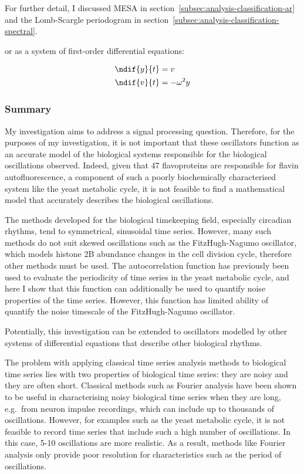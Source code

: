 For further detail, I discussed MESA in section~\ref{subsec:analysis-classification-ar} and the Lomb-Scargle periodogram in section~\ref{subsec:analysis-classification-spectral}.

or as a system of first-order differential equations:

\begin{equation}
  \begin{aligned}
    \ndif{y}{t} &= v \\
    \ndif{v}{t} &= -\omega^{2}y
  \end{aligned}
  \label{eq:harmonic-1o}
\end{equation}


\subsubsection{Summary}
\label{subsubsec:analysis-characterisation-acf-summary}

My investigation aims to address a signal processing question.
Therefore, for the purposes of my investigation, it is not important that these oscillators function as an accurate model of the biological systems responsible for the biological oscillations observed.
Indeed, given that 47 flavoproteins are responsible for flavin autofluorescence, a component of such a poorly biochemically characterised system like the yeast metabolic cycle, it is not feasible to find a mathematical model that accurately describes the biological oscillations.

The methods developed for the biological timekeeping field, especially circadian rhythms, tend to symmetrical, sinusoidal time series.
However, many such methods do not suit skewed oscillations such as the FitzHugh-Nagumo oscillator, which models histone 2B abundance changes in the cell division cycle, therefore other methods must be used.
The autocorrelation function has previously been used to evaluate the periodicity of time series in the yeast metabolic cycle, and here I show that this function can additionally be used to quantify noise properties of the time series.
However, this function has limited ability of quantify the noise timescale of the FitzHugh-Nagumo oscillator.

Potentially, this investigation can be extended to oscillators modelled by other systems of differential equations that describe other biological rhythms.



The problem with applying classical time series analysis methods to biological time series lies with two properties of biological time series: they are noisy and they are often short.
Classical methods such as Fourier analysis have been shown to be useful in characterising noisy biological time series when they are long, e.g.\ from neuron impulse recordings, which can include up to thousands of oscillations.
However, for examples such as the yeast metabolic cycle, it is not feasible to record time series that include such a high number of oscillations.
In this case, 5-10 oscillations are more realistic.
As a result, methods like Fourier analysis only provide poor resolution for characteristics such as the period of oscillations.

